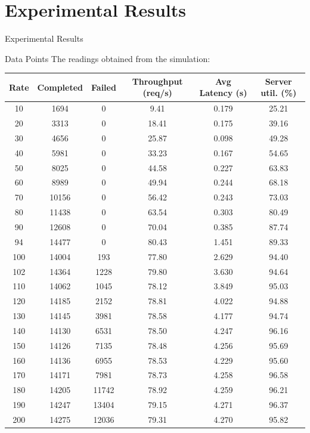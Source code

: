 \documentclass[10pt]{beamer}
\begin{document}
\section{Experimental Results}
\begin{frame}{}
    \begin{center}
        \Huge{Experimental Results}
    \end{center}
\end{frame}

\begin{frame}{Data Points}
The readings obtained from the simulation:
\centering
\scriptsize
\begin{tabular}{|c|c|c|c|c|c|}
\hline
\textbf{Rate} & \textbf{Completed} & \textbf{Failed} & \textbf{Throughput (req/s)} & \textbf{Avg Latency (s)} & \textbf{Server util. (\%)} \\
\hline
10  & 1694  & 0     & 9.41  & 0.179 & 25.21 \\
20  & 3313  & 0     & 18.41 & 0.175 & 39.16 \\
30  & 4656  & 0     & 25.87 & 0.098 & 49.28 \\
40  & 5981  & 0     & 33.23 & 0.167 & 54.65 \\
50  & 8025  & 0     & 44.58 & 0.227 & 63.83 \\
60  & 8989  & 0     & 49.94 & 0.244 & 68.18 \\
70  & 10156 & 0     & 56.42 & 0.243 & 73.03 \\
80  & 11438 & 0     & 63.54 & 0.303 & 80.49 \\
90  & 12608 & 0     & 70.04 & 0.385 & 87.74 \\
94  & 14477 & 0     & 80.43 & 1.451 & 89.33 \\
100 & 14004 & 193   & 77.80 & 2.629 & 94.40 \\
102 & 14364 & 1228  & 79.80 & 3.630 & 94.64 \\
110 & 14062 & 1045  & 78.12 & 3.849 & 95.03 \\
120 & 14185 & 2152  & 78.81 & 4.022 & 94.88 \\
130 & 14145 & 3981  & 78.58 & 4.177 & 94.74 \\
140 & 14130 & 6531  & 78.50 & 4.247 & 96.16 \\
150 & 14126 & 7135  & 78.48 & 4.256 & 95.69 \\
160 & 14136 & 6955  & 78.53 & 4.229 & 95.60 \\
170 & 14171 & 7981  & 78.73 & 4.258 & 96.58 \\
180 & 14205 & 11742 & 78.92 & 4.259 & 96.21 \\
190 & 14247 & 13404 & 79.15 & 4.271 & 96.37 \\
200 & 14275 & 12036 & 79.31 & 4.270 & 95.82 \\
\hline
\end{tabular}
\end{frame}
\end{document}
